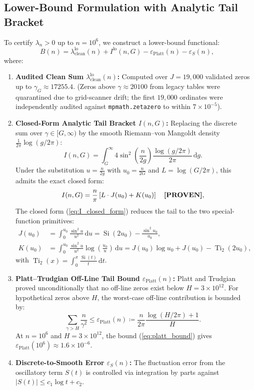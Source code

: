 \documentclass[11pt,a4paper]{article}
\theoremstyle{remark}
\newcommand{\Si}{\operatorname{Si}}
\newcommand{\Ti}{\operatorname{Ti}_2}
\newcommand{\dd}{\,\mathrm{d}}
\newcommand{\eps}{\varepsilon}
\begin{document}
\subsection{Lower-Bound Formulation with Analytic Tail Bracket}
To certify $\lambda_n > 0$ up to $n = 10^6$, we construct a lower-bound functional:
\begin{equation}
 B(n) = \lambda_{\text{clean}}^{\text{lo}}(n) + I^{\text{lo}}(n, G) - \eps_{\text{Platt}}(n) - \eps_S(n),
 \label{eq:li_bound_formula}
\end{equation}
where:
\begin{enumerate}
\item \textbf{Audited Clean Sum $\lambda_{\text{clean}}^{\text{lo}}(n)$:} Computed over $J = 19{,}000$ validated zeros up to $\gamma_G \approx 17255.4$. (Zeros above $\gamma \approx 20100$ from legacy tables were quarantined due to grid-scanner drift; the first $19{,}000$ ordinates were independently audited against \texttt{mpmath.zetazero} to within $7 \times 10^{-5}$).
\item \textbf{Closed-Form Analytic Tail Bracket $I(n,G)$:} Replacing the discrete sum over $\gamma \in [G, \infty)$ by the smooth Riemann--von Mangoldt density $\frac{1}{2\pi}\log(g/2\pi)$:
\begin{equation}
 I(n,G) = \int_G^\infty 4\sin^2\left(\frac{n}{2g}\right) \frac{\log(g/2\pi)}{2\pi} \dd g.
\end{equation}
Under the substitution $u = \frac{n}{2g}$ with $u_0 = \frac{n}{2G}$ and $L = \log(G/2\pi)$, this admits the exact closed form:
\begin{equation}
 I(n,G) = \frac{n}{\pi}\left[ L \cdot J(u_0) + K(u_0) \right] \quad \text{\textbf{[PROVEN]}},
 \label{eq:I_closed_form}
\end{equation}
The closed form (\ref{eq:I_closed_form}) reduces the tail to the two special-function primitives:
\begin{align}
 J(u_0) &= \int_0^{u_0} \frac{\sin^2 u}{u^2} \dd u = \Si(2u_0) - \frac{\sin^2 u_0}{u_0}, \\
 K(u_0) &= \int_0^{u_0} \frac{\sin^2 u}{u^2} \log\left(\frac{u_0}{u}\right) \dd u = J(u_0)\log u_0 + J(u_0) - \Ti(2u_0),
\end{align}
with $\Ti(x) = \int_0^x \frac{\Si(t)}{t} \dd t$.
\item \textbf{Platt--Trudgian Off-Line Tail Bound $\eps_{\text{Platt}}(n)$:} Platt and Trudgian \cite{platt2021} proved unconditionally that no off-line zeros exist below $H = 3 \times 10^{12}$. For hypothetical zeros above $H$, the worst-case off-line contribution is bounded by:
\begin{equation}
 \sum_{\gamma > H} \frac{n}{\gamma^2} \le \eps_{\text{Platt}}(n) \coloneqq \frac{n}{2\pi} \frac{\log(H/2\pi) + 1}{H}.
 \label{eq:platt_bound}
\end{equation}
At $n = 10^6$ and $H = 3 \times 10^{12}$, the bound (\ref{eq:platt_bound}) gives $\eps_{\text{Platt}}(10^6) \approx 1.6 \times 10^{-6}$.
\item \textbf{Discrete-to-Smooth Error $\eps_S(n)$:} The fluctuation error from the oscillatory term $S(t)$ is controlled via integration by parts against $|S(t)| \le c_1 \log t + c_2$.
\end{enumerate}
\end{document}
